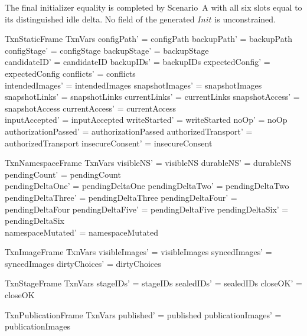 \documentclass{article}
\begin{document}
The final initializer equality is completed by Scenario~A with all six slots
equal to its distinguished idle delta.  No field of the generated $Init$ is
unconstrained.

\begin{schema}{TxnStaticFrame}
	\Delta TxnVars
	\where
	configPath' = configPath \land backupPath' = backupPath \land
	configStage' = configStage \land backupStage' = backupStage \\
	candidateID' = candidateID \land backupIDs' = backupIDs \land
	expectedConfig' = expectedConfig \land conflicts' = conflicts \\
	intendedImages' = intendedImages \land snapshotImages' = snapshotImages \\
	snapshotLinks' = snapshotLinks \land currentLinks' = currentLinks \land
	snapshotAccess' = snapshotAccess \land currentAccess' = currentAccess \\
	inputAccepted' = inputAccepted \land writeStarted' = writeStarted \land
	noOp' = noOp \\
	authorizationPassed' = authorizationPassed \land
	authorizedTransport' = authorizedTransport \land
	insecureConsent' = insecureConsent
\end{schema}

\begin{schema}{TxnNamespaceFrame}
	\Delta TxnVars
	\where
	visibleNS' = visibleNS \land durableNS' = durableNS \land
	pendingCount' = pendingCount \\
	pendingDeltaOne' = pendingDeltaOne \land pendingDeltaTwo' = pendingDeltaTwo \land
	pendingDeltaThree' = pendingDeltaThree \land
	pendingDeltaFour' = pendingDeltaFour \land
	pendingDeltaFive' = pendingDeltaFive \land pendingDeltaSix' = pendingDeltaSix \\
	namespaceMutated' = namespaceMutated
\end{schema}

\begin{schema}{TxnImageFrame}
	\Delta TxnVars
	\where
	visibleImages' = visibleImages \land syncedImages' = syncedImages \land
	dirtyChoices' = dirtyChoices
\end{schema}

\begin{schema}{TxnStageFrame}
	\Delta TxnVars
	\where
	stageIDs' = stageIDs \land sealedIDs' = sealedIDs \land closeOK' = closeOK
\end{schema}

\begin{schema}{TxnPublicationFrame}
	\Delta TxnVars
	\where
	published' = published \land publicationImages' = publicationImages
\end{schema}
\end{document}
